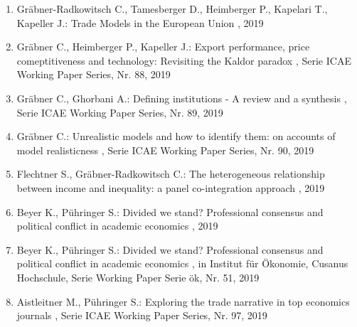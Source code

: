 \begin{enumerate}[leftmargin=*, labelsep=0.5cm]
	 \item Gräbner-Radkowitsch C., Tamesberger D., Heimberger P., Kapelari T., Kapeller J.:  Trade Models in the European Union  , 2019
	 \item Gräbner C., Heimberger P., Kapeller J.:  Export performance, price comeptitiveness and technology: Revisiting the Kaldor paradox  , Serie ICAE Working Paper Series, Nr. 88, 2019
	 \item Gräbner C., Ghorbani A.:  Defining institutions - A review and a synthesis  , Serie ICAE Working Paper Series, Nr. 89, 2019
	 \item Gräbner C.:  Unrealistic models and how to identify them: on accounts of model realisticness  , Serie ICAE Working Paper Series, Nr. 90, 2019
	 \item Flechtner S., Gräbner-Radkowitsch C.:  The heterogeneous relationship between income and inequality: a panel co-integration approach  , 2019
	 \item Beyer K., Pühringer S.:  Divided we stand? Professional consensus and political conflict in academic economics  , 2019
	 \item Beyer K., Pühringer S.:  Divided we stand? Professional consensus and political conflict in academic economics  , in Institut für Ökonomie, Cusanus Hochschule, Serie Working Paper Serie ök, Nr. 51, 2019
	 \item Aistleitner M., Pühringer S.:  Exploring the trade narrative in top economics journals  , Serie ICAE Working Paper Series, Nr. 97, 2019
\end{enumerate} 

